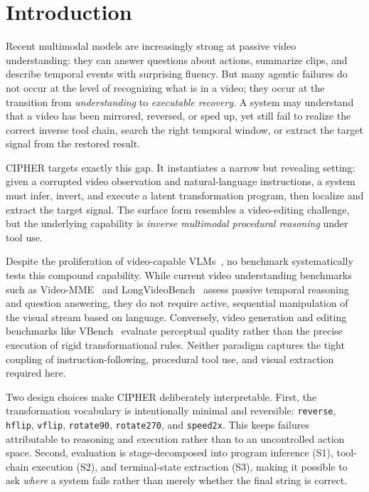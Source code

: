 \section{Introduction}
\label{sec:intro}

Recent multimodal models are increasingly strong at passive video
understanding: they can answer questions about actions, summarize clips, and
describe temporal events with surprising fluency. But many agentic failures do
not occur at the level of recognizing what is in a video; they occur at the
transition from \emph{understanding} to \emph{executable recovery}. A system
may understand that a video has been mirrored, reversed, or sped up, yet still
fail to realize the correct inverse tool chain, search the right temporal
window, or extract the target signal from the restored result.

CIPHER targets exactly this gap. It instantiates a narrow but revealing
setting: given a corrupted video observation and natural-language
instructions, a system must infer, invert, and execute a latent transformation
program, then localize and extract the target signal. The surface form
resembles a video-editing challenge, but the underlying capability is
\emph{inverse multimodal procedural reasoning} under tool use.

Despite the proliferation of video-capable VLMs~\citep{gpt4o,gemini,qwen2vl},
no benchmark systematically tests this compound capability. While current video
understanding benchmarks such as Video-MME~\citep{videomme} and
LongVideoBench~\citep{longvideobench} assess passive temporal reasoning and
question answering, they do not require active, sequential manipulation of the
visual stream based on language. Conversely, video generation and editing
benchmarks like VBench~\citep{vbench} evaluate perceptual quality rather than
the precise execution of rigid transformational rules. Neither paradigm
captures the tight coupling of instruction-following, procedural tool use, and
visual extraction required here.

Two design choices make CIPHER deliberately interpretable. First, the
transformation vocabulary is intentionally minimal and reversible:
\texttt{reverse}, \texttt{hflip}, \texttt{vflip}, \texttt{rotate90},
\texttt{rotate270}, and \texttt{speed2x}. This keeps failures attributable to
reasoning and execution rather than to an uncontrolled action space. Second,
evaluation is stage-decomposed into program inference (S1), tool-chain
execution (S2), and terminal-state extraction (S3), making it possible to ask
\emph{where} a system fails rather than merely whether the final string is
correct.

